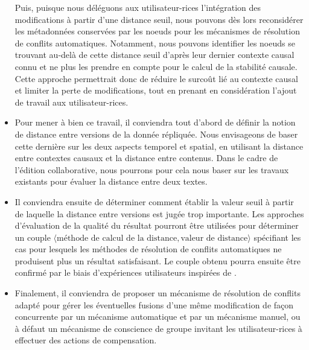 \begin{itemize}
        Puis, puisque nous déléguons aux utilisateur-rices l'intégration des modifications à partir d'une distance seuil, nous pouvons dès lors reconsidérer les métadonnées conservées par les noeuds pour les mécanismes de résolution de conflits automatiques.
        Notamment, nous pouvons identifier les noeuds se trouvant au-delà de cette distance seuil d'après leur dernier contexte causal connu et ne plus les prendre en compte pour le calcul de la stabilité causale.
        Cette approche permettrait donc de réduire le surcoût lié au contexte causal et limiter la perte de modifications, tout en prenant en considération l'ajout de travail aux utilisateur-rices.
    \item Pour mener à bien ce travail, il conviendra tout d'abord de définir la notion de distance entre versions de la donnée répliquée.
        Nous envisageons de baser cette dernière sur les deux aspects temporel et spatial, \ie en utilisant la distance entre contextes causaux et la distance entre contenus.
        Dans le cadre de l'édition collaborative, nous pourrons pour cela nous baser sur les travaux existants pour évaluer la distance entre deux textes.
    \item Il conviendra ensuite de déterminer comment établir la valeur seuil à partir de laquelle la distance entre versions est jugée trop importante.
        Les approches d'évaluation de la qualité du résultat pourront être utilisées pour déterminer un couple $\langle \text{méthode de calcul de la distance}, \text{valeur de distance} \rangle$ spécifiant les cas pour lesquels les méthodes de résolution de conflits automatiques ne produisent plus un résultat satisfaisant.
        Le couple obtenu pourra ensuite être confirmé par le biais d'expériences utilisateurs inspirées de \cite{2014-effect-delay-collaborative-editing-ignat,2015-cope-delay-collaborative-note-taking-ignat}.
    \item Finalement, il conviendra de proposer un mécanisme de résolution de conflits adapté pour gérer les éventuelles fusions d'une même modification de façon concurrente par un mécanisme automatique et par un mécanisme manuel, ou à défaut un mécanisme de conscience de groupe invitant les utilisateur-rices à effectuer des actions de compensation.
\end{itemize}
